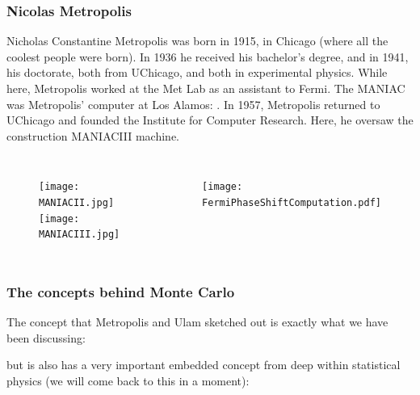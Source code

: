 \documentclass[hyperref={colorlinks=true}]{beamer}
\begin{document}
\begin{frame}[shrink=20]
  \frametitle{Nicolas Metropolis}
  
  Nicholas Constantine Metropolis was born in 1915, in Chicago (where all the coolest people were born). In 1936 he received his bachelor's degree, and in 1941, his doctorate, both from UChicago, and both in experimental physics. While here, Metropolis worked at the Met Lab as an assistant to Fermi. The MANIAC was Metropolis' computer at Los Alamos:  . In 1957, Metropolis returned to UChicago and founded the Institute for Computer Research. Here, he oversaw the construction MANIACIII machine.
  
  \vspace{-0.4cm}
  
  \begin{columns}
  
    
      \begin{figure}
        \centering
        \texttt{[image: MANIACII.jpg]}\\
        \texttt{[image: MANIACIII.jpg]}
      \end{figure}
    
    
      \begin{figure}
        \centering
        \texttt{[image: FermiPhaseShiftComputation.pdf]}
      \end{figure}
  
  \end{columns}
  
\end{frame}




\begin{frame}%
  \frametitle{The concepts behind Monte Carlo}
  
  The concept that Metropolis and Ulam sketched out is exactly what we have been discussing:
  
  \begin{figure}
    \centering
  \end{figure}
  
  but is also has a very important embedded concept from deep within statistical physics (we will come back to this in a moment):
  
  \begin{figure}
    \centering
  \end{figure}
  
\end{frame}
\end{document}
